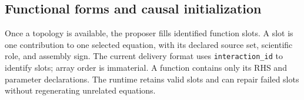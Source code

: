 \subsection{Functional forms and causal initialization}

Once a topology is available, the proposer fills identified function slots.
A slot is one contribution to one selected equation, with its declared source
set, scientific role, and assembly sign. The current delivery format uses
\texttt{interaction\_id} to identify slots; array order is immaterial. A function
contains only its RHS and parameter declarations. The runtime retains valid
slots and can repair failed slots without regenerating unrelated equations.

